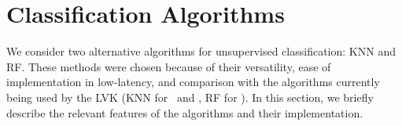 \section{Classification Algorithms} \label{algos}

We consider two alternative algorithms for unsupervised classification: \ac{KNN} and \ac{RF}. These methods were chosen because of their versatility, ease of implementation in
low-latency, and comparison with the algorithms currently being used by the \ac{LVK} (\ac{KNN} for \hasns\ and \hasrem, \ac{RF} for \hasgap). In this section, we briefly describe the
relevant features of the algorithms and their implementation. 





